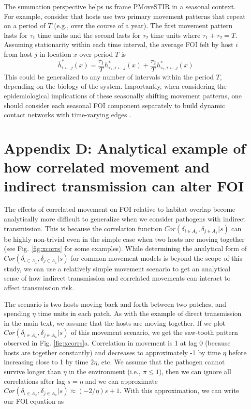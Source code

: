 \documentclass[11pt]{article}
\begin{document}
The summation perspective helps us frame PMoveSTIR in a seasonal context.  For example, consider that hosts use two primary movement patterns that repeat on a period of $T$ (e.g., over the course of a year).  The first movement pattern lasts for $\tau_1$ time units and the second lasts for $\tau_2$ time units where $\tau_1 + \tau_2 = T$.  Assuming stationarity within each time interval, the average FOI felt by host $i$ from host $j$ in location $x$ over period $T$ is 
\begin{equation}
\bar{h}^*_{i \leftarrow j}(x) = \frac{\tau_1}{T} h^*_{\tau_1, i \leftarrow j}(x) + \frac{\tau_2}{T} h^*_{\tau_2, i \leftarrow j}(x)
\label{eq:seasonal}
\end{equation}
This could be generalized to any number of intervals within the period $T$, depending on the biology of the system.  Importantly, when considering the epidemiological implications of these seasonally shifting movement patterns, one should consider each seasonal FOI component separately to build dynamic contact networks with time-varying edges \citep{Wilber2022}.


\section*{Appendix D: Analytical example of how correlated movement and indirect transmission can alter FOI}

The effects of correlated movement on FOI relative to habitat overlap become analytically more difficult to generalize when we consider pathogens with indirect transmission.  This is because the correlation function $Cor(\delta_{i \in A_x}, \delta_{j \in A_x} | s)$ can be highly non-trivial even in the simple case when two hosts are moving together (see Fig. \ref{fig:xcorrs} for some examples).  
While determining the analytical form of $Cor(\delta_{i \in A_x}, \delta_{j \in A_x} | s)$ for common movement models is beyond the scope of this study, we can use a relatively simple movement scenario to get an analytical sense of how indirect transmission and correlated movements can interact to affect transmission risk.

The scenario is two hosts moving back and forth between two patches, and spending $\eta$ time units in each patch.  As with the example of direct transmission in the main text, we assume that the hosts are moving together. If we plot $Cor(\delta_{i \in A_x}, \delta_{j \in A_x} | s)$ of this movement scenario, we get the saw-tooth pattern observed in Fig. \ref{fig:xcorrs}a.  
Correlation in movement is 1 at lag 0 (because hosts are together constantly) and decreases to approximately -1 by time $\eta$ before increasing close to 1 by time $2\eta$, etc. 
We assume that the pathogen cannot survive longer than $\eta$ in the environment (i.e., $\pi \leq 1$), then we can ignore all correlations after lag $s = \eta$ and we can approximate $Cor(\delta_{i \in A_x}, \delta_{j \in A_x} | s) \approx (-2 / \eta)s + 1$.  With this approximation, we can write our FOI equation as
\end{document}
